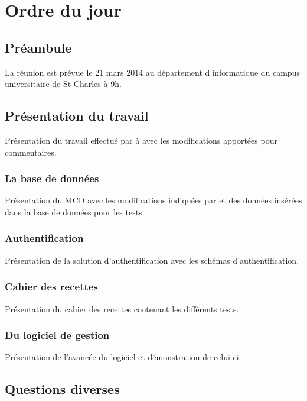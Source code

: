 \documentclass[11pt,fleqn]{report}
\begin{document}
\ZMakeCover


\chapter*{Ordre du jour}
\setcounter{chapter}{1}

\section{Préambule}
La réunion est prévue le 21 mars 2014 au département d'informatique du campus universitaire de St Charles à 9h.

\section{Présentation du travail}
Présentation du travail effectué par \amo à \mo avec les modifications apportées pour commentaires.

\subsection{La base de données}
Présentation du MCD avec les modifications indiquées par \mo et des données insérées dans la base de données pour les tests.

\subsection{Authentification}
Présentation de la solution d'authentification avec les schémas d'authentification.

\subsection{Cahier des recettes}
Présentation du cahier des recettes contenant les différents tests.

\subsection{Du logiciel de gestion}
Présentation de l'avancée du logiciel et démonstration de celui ci. 

\section{Questions diverses}
\end{document}
